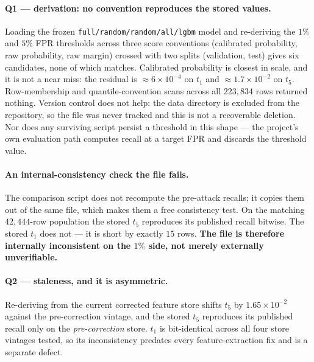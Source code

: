 \documentclass{article}
\newcommand{\arm}[1]{\texttt{#1}}
\begin{document}
\paragraph{Q1 --- derivation: no convention reproduces the stored values.}
\sloppy Loading the frozen \arm{full/random/random/all/lgbm} model and
re-deriving the $1\%$ and $5\%$ FPR thresholds across three score conventions
(calibrated probability, raw probability, raw margin) crossed with two splits
(validation, test) gives six candidates, none of which matches. Calibrated
probability is closest in scale, and it is not a near miss: the residual is
$\approx\!6\times10^{-4}$ on $t_{1}$ and $\approx\!1.7\times10^{-2}$ on $t_{5}$.
Row-membership and quantile-convention scans across all $223{,}834$ rows
returned nothing. Version control does not help: the data directory is excluded
from the repository, so the file was never tracked and this is not a recoverable
deletion. Nor does any surviving script persist a threshold in this shape --- the
project's own evaluation path computes recall at a target FPR and discards the
threshold value.

\paragraph{An internal-consistency check the file fails.}
The comparison script does not recompute the pre-attack recalls; it copies them
out of the same file, which makes them a free consistency test. On the matching
$42{,}444$-row population the stored $t_{5}$ reproduces its published recall
bitwise. The stored $t_{1}$ does not --- it is short by exactly $15$ rows.
\textbf{The file is therefore internally inconsistent on the $1\%$ side, not
merely externally unverifiable.}

\paragraph{Q2 --- staleness, and it is asymmetric.} Re-deriving from the current
corrected feature store shifts $t_{5}$ by $1.65\times10^{-2}$ against the
pre-correction vintage, and the stored $t_{5}$ reproduces its published recall
only on the \emph{pre-correction} store. $t_{1}$ is bit-identical across all four
store vintages tested, so its inconsistency predates every feature-extraction
fix and is a separate defect.
\end{document}
